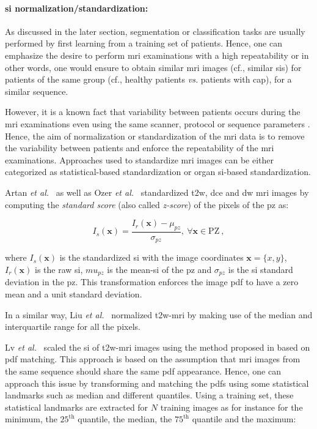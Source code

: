 \paragraph{\Ac{si} normalization/standardization:} As discussed in the later section, segmentation or classification tasks are usually performed by first learning from a training set of patients.
Hence, one can emphasize the desire to perform \ac{mri} examinations with a high repeatability or in other words, one would ensure to obtain similar \ac{mri} images (cf., similar \acp{si}) for patients of the same group (cf., healthy patients \textit{vs.} patients with \ac{cap}), for a similar sequence.

However, it is a known fact that variability between patients occurs during the \ac{mri} examinations even using the same scanner, protocol or sequence parameters \cite{Nyul1999}.
Hence, the aim of normalization or standardization of the \ac{mri} data is to remove the variability between patients and enforce the repeatability of the \ac{mri} examinations.
Approaches used to standardize \ac{mri} images can be either categorized as statistical-based standardization or organ \ac{si}-based standardization. 

Artan \textit{et al.}~\cite{Artan2009,Artan2010} as well as Ozer \textit{et al.}~\cite{Ozer2009,Ozer2010} standardized \ac{t2w}, \ac{dce} and \ac{dw} \ac{mri} images by computing the \textit{standard score} (also called \textit{z-score}) of the pixels of the \ac{pz} as:

\begin{equation}
	I_s(\mathbf{x}) = \frac{ I_r(\mathbf{x}) - \mu_{pz}}{\sigma_{pz}}, \ \forall \mathbf{x} \in \text{PZ} \ ,
	\label{eq:meansta}
\end{equation}

\noindent where $I_s(\mathbf{x})$ is the standardized \ac{si} with the image coordinates $\mathbf{x} = \{x,y\}$, $I_r(\mathbf{x})$ is the raw \ac{si}, $mu_{pz}$ is the mean-\ac{si} of the \ac{pz} and $\sigma_{pz}$ is the \ac{si} standard deviation in the \ac{pz}.
This transformation enforces the image \ac{pdf} to have a zero mean and a unit standard deviation.

In a similar way, Liu \textit{et al.}~\cite{Liu2013} normalized \ac{t2w}-\ac{mri} by making use of the median and interquartile range for all the pixels.

Lv \textit{et al.}~\cite{Lv2009} scaled the \ac{si} of \ac{t2w}-\ac{mri} images using the method proposed in \cite{Nyul2000} based on \ac{pdf} matching.
This approach is based on the assumption that \ac{mri} images from the same sequence should share the same \ac{pdf} appearance.
Hence, one can approach this issue by transforming and matching the \acp{pdf} using some statistical landmarks such as median and different quantiles.
Using a training set, these statistical landmarks are extracted for $N$ training images as for instance for the minimum, the $25^{\text{th}}$ quantile, the median, the $75^{\text{th}}$ quantile and the maximum:

